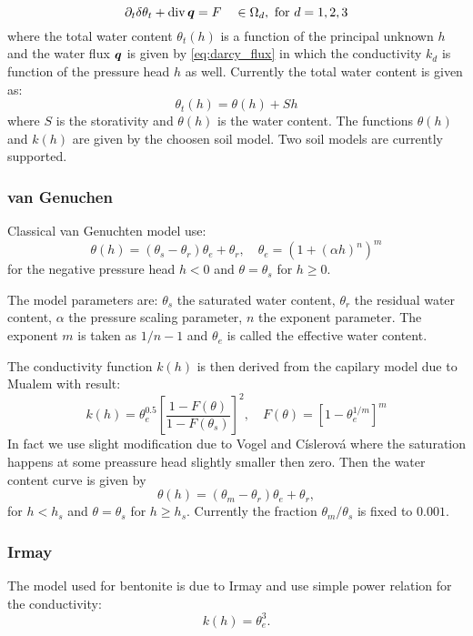 \begin{equation}
 \partial_t \delta \theta_t + \operatorname{div} \mathbf{\boldsymbol{q}} = F\quad \in\Omega_d, \text{ for } d=1,2,3
\end{equation}
where the total water content $\theta_t(h)$ \units{}{}{} is a function of the principal unknown $h$ and the water flux $\mathbf{\boldsymbol{q}}$ is given by \eqref{eq:darcy_flux} 
in which the conductivity $k_d$ is function of the pressure head $h$ as well.
Currently the total water content is given as:
\begin{equation}
    \theta_t(h) = \theta(h) + Sh
\end{equation}
where $S$ is the storativity and $\theta(h)$ is the water content. The functions $\theta(h)$ and $k(h)$ are given by the choosen soil model.
Two soil models are currently supported.

\subsubsection{van Genuchen}
Classical van Genuchten model use:
\[
    \theta(h) = (\theta_s-\theta_r)\theta_e + \theta_r,\quad \theta_e = (1+ (\alpha h)^n)^m
\]
for the negative pressure head $h<0$ and $\theta = \theta_s$ for $h\ge 0$.

The model parameters are:
    $\theta_s$ \units{}{}{} the saturated water content,
    $\theta_r$ \units{}{}{} the residual water content,
    $\alpha$  the pressure scaling parameter,
    $n$ \units{}{}{} the exponent parameter.
The exponent $m$ is taken as $1/n-1$ and $\theta_e$ \units{}{}{} is called the effective water content.

The conductivity function $k(h)$ is then derived from the capilary model due to Mualem with result:
\[
    k(h) = \theta_e^{0.5} \left[ \frac{1-F(\theta)}{1-F(\theta_s)} \right]^2,\quad F(\theta)= \left[ 1- \theta_e^{1/m} \right]^m
\]
In fact we use slight modification due to Vogel and Císlerová where the saturation happens at some preassure head slightly smaller then zero.
Then the water content curve is given by 
\[
    \theta(h) = (\theta_m-\theta_r)\theta_e + \theta_r,
\]
for $h< h_s$ and $\theta = \theta_s$ for $h\ge h_s$. Currently the fraction $\theta_m / \theta_s$ is fixed to $0.001$.

\subsubsection{Irmay}
The model used for bentonite is due to Irmay and use simple power relation for the conductivity:
\[
   k(h) = \theta_e^{3}.
\]


